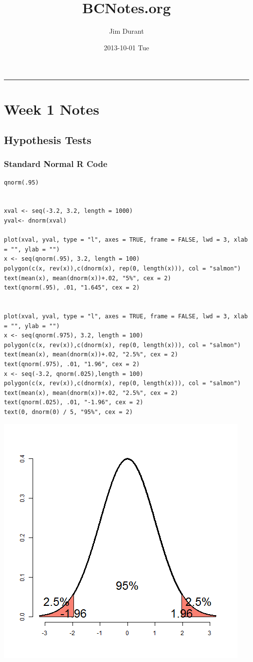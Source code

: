 \documentclass[11pt]{article}
\title{BCNotes.org}
\author{Jim Durant}
\date{2013-10-01 Tue}
\begin{document}
\maketitle

\setcounter{tocdepth}{3}
\tableofcontents
\vspace*{1cm}
\hrule
\section{Week 1 Notes}
\label{sec-1}
\subsection{Hypothesis Tests}
\label{sec-1-1}
\subsubsection{Standard Normal R Code}
\label{sec-1-1-1}


\begin{verbatim}
qnorm(.95)


xval <- seq(-3.2, 3.2, length = 1000)
yval<- dnorm(xval)

plot(xval, yval, type = "l", axes = TRUE, frame = FALSE, lwd = 3, xlab = "", ylab = "")
x <- seq(qnorm(.95), 3.2, length = 100)
polygon(c(x, rev(x)),c(dnorm(x), rep(0, length(x))), col = "salmon")
text(mean(x), mean(dnorm(x))+.02, "5%", cex = 2)
text(qnorm(.95), .01, "1.645", cex = 2)


plot(xval, yval, type = "l", axes = TRUE, frame = FALSE, lwd = 3, xlab = "", ylab = "")
x <- seq(qnorm(.975), 3.2, length = 100)
polygon(c(x, rev(x)),c(dnorm(x), rep(0, length(x))), col = "salmon")
text(mean(x), mean(dnorm(x))+.02, "2.5%", cex = 2)
text(qnorm(.975), .01, "1.96", cex = 2)
x <- seq(-3.2, qnorm(.025),length = 100)
polygon(c(x, rev(x)),c(dnorm(x), rep(0, length(x))), col = "salmon")
text(mean(x), mean(dnorm(x))+.02, "2.5%", cex = 2)
text(qnorm(.025), .01, "-1.96", cex = 2)
text(0, dnorm(0) / 5, "95%", cex = 2)
\end{verbatim}

\includegraphics[width=.9\linewidth]{figure1.png}
\end{document}
